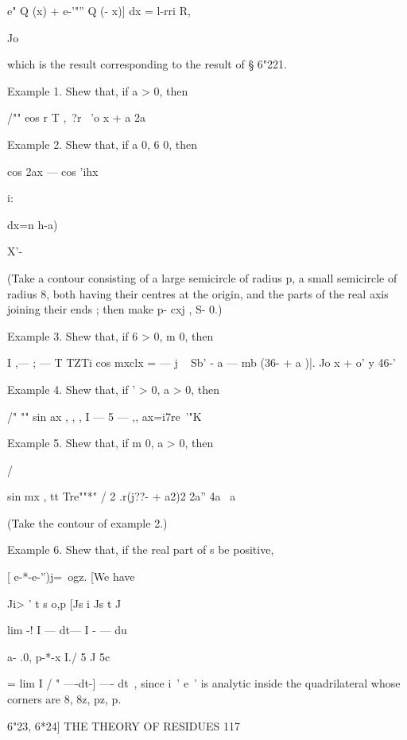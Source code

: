  e"    Q (x) + e-'"''  Q (- x)] dx = l-rri R, 

Jo 

which is the result corresponding to the result of § 6"221. 

Example 1. Shew that, if a > 0, then 

/"" eos r T ,\  ?r \   
'o x  + a  2a 





Example 2. Shew that, if a   0, 6 0, then 

cos 2ax — cos 'ihx 



i: 



dx=n  h-a) 



X'- 

(Take a contour consisting of a large semicircle of radius p, a small semicircle of 
radius 8, both having their centres at the origin, and the parts of the real axis joining their 
ends ; then make p-  cxj , S- 0.) 

Example 3. Shew that, if 6 > 0, m   0, then 

I ,— ; — T TZTi cos mxclx = — j ~  Sb'  - a  — mb (36- + a )|. 
Jo  x  + o' y 46-'   

Example 4. Shew that, if  ' > 0, a > 0, then 

/" ""   sin ax , , , 
I — 5 — ,, ax=i7re~'"K 

Example 5. Shew that, if m   0, a > 0, then 



/ 



sin mx , tt Tre""*" / 2 
.r(j??- + a2)2 2a'' 4a  \ a 



(Take the contour of example 2.) 

Example 6. Shew that, if the real part of s be positive, 

[  e-*-e-'')j=\ ogz. 
[We have 

Ji>   ' t s o,p  [Js i Js t J 

lim -! I — dt— I - — du 



a- .0, p-*-x I./ 5   J 5c 

= lim I / " —-dt-] —- dt\ , 
since i~' e~' is analytic inside the quadrilateral whose corners are 8, 8z, pz, p. 



6"23, 6*24] THE THEORY OF RESIDUES 117 

